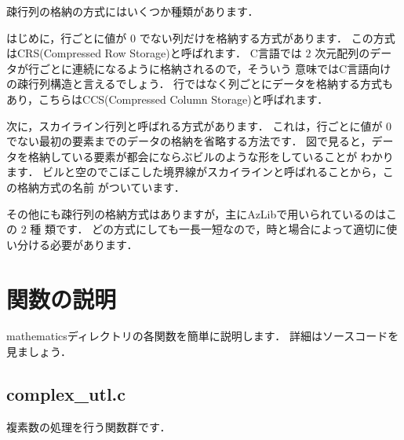 疎行列の格納の方式にはいくつか種類があります．

はじめに，行ごとに値が $0$ でない列だけを格納する方式があります．
この方式はCRS(Compressed Row Storage)と呼ばれます．
C言語では $2$ 次元配列のデータが行ごとに連続になるように格納されるので，そういう
意味ではC言語向けの疎行列構造と言えるでしょう．
行ではなく列ごとにデータを格納する方式もあり，こちらはCCS(Compressed Column 
Storage)と呼ばれます．

次に，スカイライン行列と呼ばれる方式があります．
これは，行ごとに値が $0$ でない最初の要素までのデータの格納を省略する方法です．
図で見ると，データを格納している要素が都会にならぶビルのような形をしていることが
わかります．
ビルと空のでこぼこした境界線がスカイラインと呼ばれることから，この格納方式の名前
がついています．

その他にも疎行列の格納方式はありますが，主にAzLibで用いられているのはこの $2$ 種
類です．
どの方式にしても一長一短なので，時と場合によって適切に使い分ける必要があります．

\section{関数の説明}

mathematicsディレクトリの各関数を簡単に説明します．
詳細はソースコードを見ましょう．

\subsection{complex\_utl.c}

複素数の処理を行う関数群です．

